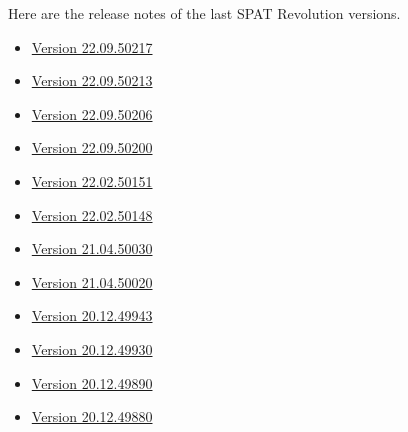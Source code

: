 \documentclass[
  letterpaper,
  DIV=11,
  numbers=noendperiod]{scrreport}
\providecommand{\tightlist}{%
  \setlength{\itemsep}{0pt}\setlength{\parskip}{0pt}}\usepackage{longtable,booktabs,array}
\begin{document}
Here are the release notes of the last SPAT Revolution versions.

\begin{itemize}
\tightlist
\item
  \href{Appendix_D_release_notes/Appendix_D_release_notes_50219.md}{Version
  22.09.50217}
\item
  \href{Appendix_D_release_notes/Appendix_D_release_notes_50213.md}{Version
  22.09.50213}
\item
  \href{Appendix_D_release_notes/Appendix_D_release_notes_50206.md}{Version
  22.09.50206}
\item
  \href{Appendix_D_release_notes/Appendix_D_release_notes_50200.md}{Version
  22.09.50200}
\item
  \href{Appendix_D_release_notes/Appendix_D_release_notes_50151.md}{Version
  22.02.50151}
\item
  \href{Appendix_D_release_notes/Appendix_D_release_notes_50148.md}{Version
  22.02.50148}
\item
  \href{Appendix_D_release_notes/Appendix_D_release_notes_50030.md}{Version
  21.04.50030}
\item
  \href{Appendix_D_release_notes/Appendix_D_release_notes_50020.md}{Version
  21.04.50020}
\item
  \href{Appendix_D_release_notes/Appendix_D_release_notes_49943.md}{Version
  20.12.49943}
\item
  \href{Appendix_D_release_notes/Appendix_D_release_notes_49930.md}{Version
  20.12.49930}
\item
  \href{Appendix_D_release_notes/Appendix_D_release_notes_49890.md}{Version
  20.12.49890}
\item
  \href{Appendix_D_release_notes/Appendix_D_release_notes_49880.md}{Version
  20.12.49880}
\end{itemize}
\end{document}
